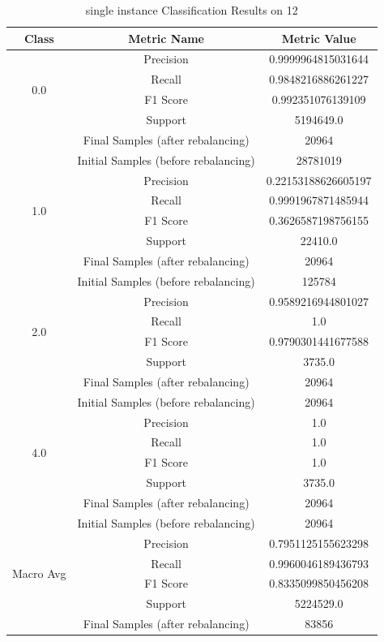 \begin{longtable}{|c|c|c|}
\caption{single instance Classification Results on 12} \label{tab:12_single_instance_classifiers_results} \\
\hline
Class & Metric Name & Metric Value \\
\hline
\multirow{4}{*}{0.0} & Precision & 0.9999964815031644 \\
 & Recall & 0.9848216886261227 \\
 & F1 Score & 0.992351076139109 \\
 & Support & 5194649.0 \\
 & Final Samples (after rebalancing) & 20964 \\
 & Initial Samples (before rebalancing) & 28781019 \\
\hline
\multirow{4}{*}{1.0} & Precision & 0.22153188626605197 \\
 & Recall & 0.9991967871485944 \\
 & F1 Score & 0.3626587198756155 \\
 & Support & 22410.0 \\
 & Final Samples (after rebalancing) & 20964 \\
 & Initial Samples (before rebalancing) & 125784 \\
\hline
\multirow{4}{*}{2.0} & Precision & 0.9589216944801027 \\
 & Recall & 1.0 \\
 & F1 Score & 0.9790301441677588 \\
 & Support & 3735.0 \\
 & Final Samples (after rebalancing) & 20964 \\
 & Initial Samples (before rebalancing) & 20964 \\
\hline
\multirow{4}{*}{4.0} & Precision & 1.0 \\
 & Recall & 1.0 \\
 & F1 Score & 1.0 \\
 & Support & 3735.0 \\
 & Final Samples (after rebalancing) & 20964 \\
 & Initial Samples (before rebalancing) & 20964 \\
\hline
\multirow{4}{*}{Macro Avg} & Precision & 0.7951125155623298 \\
 & Recall & 0.9960046189436793 \\
 & F1 Score & 0.8335099850456208 \\
 & Support & 5224529.0 \\
 & Final Samples (after rebalancing) & 83856 \\

\end{longtable}
